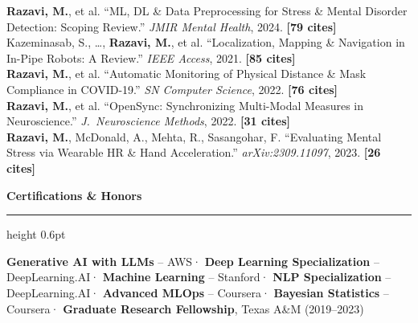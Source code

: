 \documentclass[10.5pt,letterpaper]{article}
\newcommand{\cvsection}[1]{%
  \vspace{0.18em}%
  {\color{headerblue}\large\bfseries #1}%
  \vspace{0.06em}%
  {\color{goldaccent}\hrule height 0.6pt}%
  \vspace{0.18em}%
}
\begin{document}
{\color{darktext}
\textbf{Razavi, M.}, et al. ``ML, DL \& Data Preprocessing for Stress \& Mental Disorder Detection: Scoping Review.'' \textit{JMIR Mental Health}, 2024. \textbf{[79 cites]}\\[0.04em]
Kazeminasab, S., \dots, \textbf{Razavi, M.}, et al. ``Localization, Mapping \& Navigation in In-Pipe Robots: A Review.'' \textit{IEEE Access}, 2021. \textbf{[85 cites]}\\[0.04em]
\textbf{Razavi, M.}, et al. ``Automatic Monitoring of Physical Distance \& Mask Compliance in COVID-19.'' \textit{SN Computer Science}, 2022. \textbf{[76 cites]}\\[0.04em]
\textbf{Razavi, M.}, et al. ``OpenSync: Synchronizing Multi-Modal Measures in Neuroscience.'' \textit{J.\ Neuroscience Methods}, 2022. \textbf{[31 cites]}\\[0.04em]
\textbf{Razavi, M.}, McDonald, A., Mehta, R., Sasangohar, F. ``Evaluating Mental Stress via Wearable HR \& Hand Acceleration.'' \textit{arXiv:2309.11097}, 2023. \textbf{[26 cites]}
}

\cvsection{Certifications \& Honors}

{\color{darktext}
\textbf{Generative AI with LLMs} {\color{lightgray}-- AWS}\enspace·\enspace
\textbf{Deep Learning Specialization} {\color{lightgray}-- DeepLearning.AI}\enspace·\enspace
\textbf{Machine Learning} {\color{lightgray}-- \mbox{Stanford}}\enspace·\enspace
\textbf{NLP Specialization} {\color{lightgray}-- DeepLearning.AI}\enspace·\enspace
\textbf{Advanced MLOps} {\color{lightgray}-- Coursera}\enspace·\enspace
\textbf{Bayesian Statistics} {\color{lightgray}-- Coursera}\enspace·\enspace
\textbf{Graduate \mbox{Research} Fellowship}, Texas A\&M (2019--2023)
}
\end{document}
